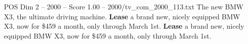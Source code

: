\begin{textsample}{POS Dim 2 – 2000 – Score 1.00 – 2000/tv\_com\_2000\_113.txt}  \label{ex:f2_pos_090}
The new BMW X3, the ultimate driving machine. \textbf{Lease} a brand new, nicely equipped BMW X3, now for \$459 a month, only through March 1st. \textbf{Lease} a brand new, nicely equipped BMW X3, now for \$459 a month, only through March 1st.

\end{textsample}
